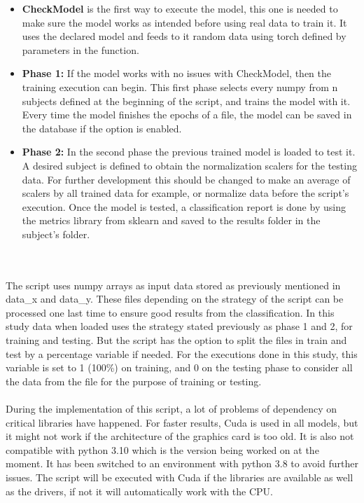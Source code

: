 \begin{itemize}
  \item \textbf{CheckModel} is the first way to execute the model, this one is needed to make sure the model works as intended before using real data to train it. It uses the declared model and feeds to it random data using torch defined by parameters in the function.
  \item \textbf{Phase 1:} If the model works with no issues with CheckModel, then the training execution can begin. This first phase selects every numpy from n subjects defined at the beginning of the script, and trains the model with it. Every time the model finishes the epochs of a file, the model can be saved in the database if the option is enabled.
  \item \textbf{Phase 2:} In the second phase the previous trained model is loaded to test it. A desired subject is defined to obtain the normalization scalers for the testing data. For further development this should be changed to make an average of scalers by all trained data for example, or normalize data before the script’s execution. Once the model is tested, a classification report is done by using the metrics library from sklearn and saved to the results folder in the subject’s folder.
\end{itemize}
\leavevmode\\
\\
The script uses numpy arrays as input data stored as previously mentioned in data\_x and data\_y. These files depending on the strategy of the script can be processed one last time to ensure good results from the classification. In this study data when loaded uses the strategy stated previously as phase 1 and 2, for training and testing. But the script has the option to split the files in train and test by a percentage variable if needed. For the executions done in this study, this variable is set to 1 (100\%) on training, and 0 on the testing phase to consider all the data from the file for the purpose of training or testing.
\\\\
During the implementation of this script, a lot of problems of dependency on critical libraries have happened. For faster results, Cuda is used in all models, but it might not work if the architecture of the graphics card is too old. It is also not compatible with python 3.10 which is the version being worked on at the moment. It has been switched to an environment with python 3.8 to avoid further issues. The script will be executed with Cuda if the libraries are available as well as the drivers, if not it will automatically work with the CPU.
